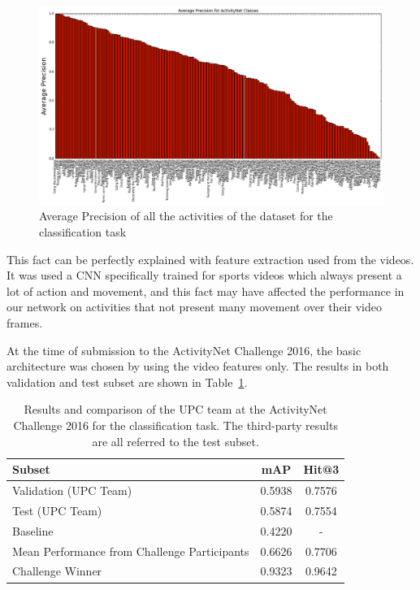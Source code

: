 
\begin{figure}[H]
\begin{center}
\includegraphics[width=1\linewidth]{img/results/ap_by_activity_classification}
\end{center}
\caption{Average Precision of all the activities of the dataset for the classification task}
\label{fig:ap_by_activity_classification}
\end{figure}

This fact can be perfectly explained with feature extraction used from the videos. It was used a CNN specifically trained for sports videos which always present a lot of action and movement, and this fact may have affected the performance in our network on activities that not present many movement over their video frames.

At the time of submission to the ActivityNet Challenge 2016, the basic architecture was chosen by using the video features only. The results in both validation and test subset are shown in Table~\ref{table:classification_results_challenge}.

\begin{table}[H]
\begin{center}
\begin{tabular}{|m{5cm}|c|c|}
\hline
\textbf{Subset} & \textbf{mAP} & \textbf{Hit@3} \\
\hline\hline
Validation (UPC Team) & 0.5938 & 0.7576 \\
Test (UPC Team) & 0.5874 & 0.7554 \\
\hline\hline
Baseline~\cite{caba2015activitynet} & 0.4220 & - \\
\hline
Mean Performance from Challenge Participants & 0.6626 & 0.7706 \\
\hline
Challenge Winner~\cite{WangQT15action,2015arXiv150702159W} & 0.9323 & 0.9642 \\
\hline
\end{tabular}
\end{center}
\caption{Results and comparison of the UPC team at the ActivityNet Challenge 2016 for the classification task. The third-party results are all referred to the test subset.}
\label{table:classification_results_challenge}
\end{table}

